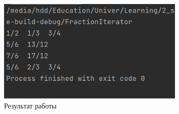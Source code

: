 \documentclass[a4paper, 14pt]{extarticle}
\begin{document}
\begin{figure}[!htb]
	\centering
	\includegraphics[width=0.8\textwidth]{output.png}
\caption{Результат работы}
\label{fig:output}
\end{figure}
\end{document}
